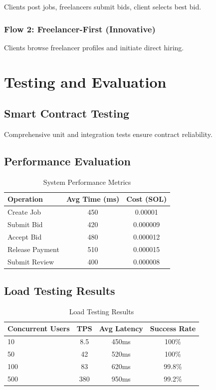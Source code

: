 \documentclass[a4paper,13pt,twoside]{report}
\theoremstyle{definition}
\begin{document}
Clients post jobs, freelancers submit bids, client selects best bid.

\subsubsection{Flow 2: Freelancer-First (Innovative)}

Clients browse freelancer profiles and initiate direct hiring.

\section{Testing and Evaluation}

\subsection{Smart Contract Testing}

Comprehensive unit and integration tests ensure contract reliability.

\subsection{Performance Evaluation}

\begin{table}[h]
\centering
\caption{System Performance Metrics}
\begin{tabular}{|l|c|c|}
\hline
\textbf{Operation} & \textbf{Avg Time (ms)} & \textbf{Cost (SOL)} \\
\hline
Create Job & 450 & 0.00001 \\
Submit Bid & 420 & 0.000009 \\
Accept Bid & 480 & 0.000012 \\
Release Payment & 510 & 0.000015 \\
Submit Review & 400 & 0.000008 \\
\hline
\end{tabular}
\end{table}

\subsection{Load Testing Results}

\begin{table}[h]
\centering
\caption{Load Testing Results}
\begin{tabular}{|l|c|c|c|}
\hline
\textbf{Concurrent Users} & \textbf{TPS} & \textbf{Avg Latency} & \textbf{Success Rate} \\
\hline
10 & 8.5 & 450ms & 100\% \\
50 & 42 & 520ms & 100\% \\
100 & 83 & 620ms & 99.8\% \\
500 & 380 & 950ms & 99.2\% \\
\hline
\end{tabular}
\end{table}
\end{document}
